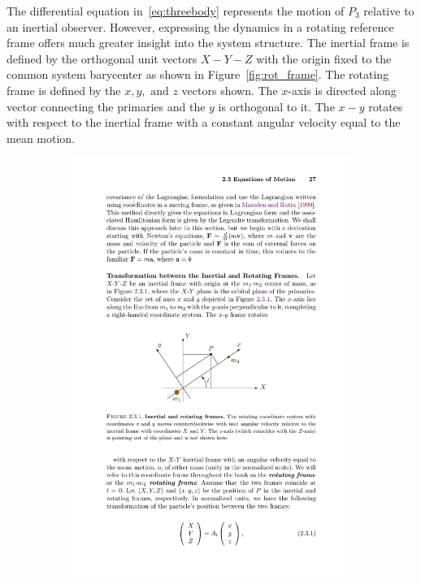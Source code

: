 The differential equation in~\eqref{eq:threebody} represents the motion of \(P_3\) relative to an inertial observer.
However, expressing the dynamics in a rotating reference frame offers much greater insight into the system structure. 
The inertial frame is defined by the orthogonal unit vectors \(X-Y-Z\) with the origin fixed to the common system barycenter as shown in Figure~\ref{fig:rot_frame}.
The rotating frame is defined by the \(x,y, \text{ and } z \) vectors shown. 
The \(x\)-axis is directed along vector connecting the primaries and the \(y\) is orthogonal to it. 
The \(x-y\) rotates with respect to the inertial frame with a constant angular velocity equal to the mean motion.
\begin{figure}[htbp]%
\centering
        \begin{subfigure}[H]{0.5\columnwidth}%
                \includegraphics[width=\textwidth]{figures/2015_SSPI/rot_frame}%

\end{subfigure}
\end{figure}

